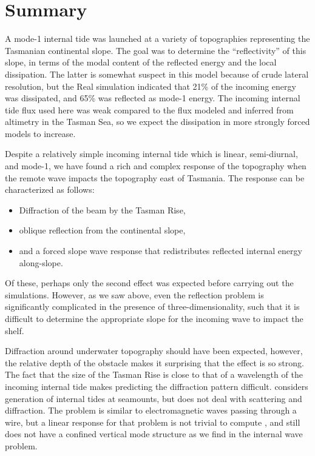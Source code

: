 \documentclass[10pt]{article}
\newcommand{\mn}[1]{{\sc #1}}
\begin{document}
\section{Summary}
\label{sec:Summary}

A mode-1 internal tide was launched at a variety of topographies representing the Tasmanian continental slope.  The goal was to determine the ``reflectivity'' of this slope, in terms of the modal content of the reflected energy and the local dissipation.  The latter is somewhat suspect in this model because of crude lateral resolution, but the \mn{Real} simulation indicated that 21\% of the incoming energy was dissipated, and 65\% was reflected as mode-1 energy.  The incoming internal tide flux used here was  weak compared to the flux modeled and inferred from altimetry in the Tasman Sea, so we expect the dissipation in more strongly forced models to increase.  

Despite a relatively simple incoming internal tide which is linear, semi-diurnal, and mode-1, we have found a rich and complex response of the topography when the remote wave impacts the topography east of Tasmania.  The response can be characterized as follows:
\begin{itemize}
  \item Diffraction of the beam by the Tasman Rise,
  \item oblique reflection from the continental slope,
  \item and a forced slope wave response that redistributes reflected internal energy along-slope.  
\end{itemize}
Of these, perhaps only the second effect was expected before carrying out the simulations.  However, as we saw above, even the reflection problem is significantly complicated in the presence of three-dimensionality, such that it is difficult to determine the appropriate slope for the incoming wave to impact the shelf.  

Diffraction around underwater topography should have been expected, however, the relative depth of the obstacle makes it surprising that the effect is so strong.  The fact that the size of the Tasman Rise is close to that of a wavelength of the incoming internal tide makes predicting the diffraction pattern difficult.  \citet{baines07} considers generation of internal tides at seamounts, but does not deal with scattering and diffraction.  The problem is similar to electromagnetic waves passing through a wire, but a linear response for that problem is not trivial to compute \citep[i.e.][]{bonod2005differential}, and still does not have a confined vertical mode structure as we find in the internal wave problem.
\end{document}
